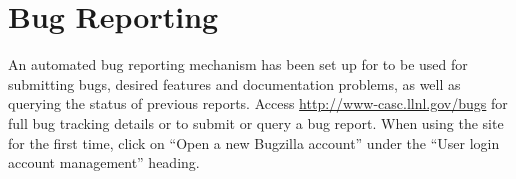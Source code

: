 %
%
%
%
%
%


\section{Bug Reporting}

An automated bug reporting mechanism has been set up for \hypre{} to be used for
submitting bugs, desired features and documentation problems, as well as
querying the status of previous reports.  Access
\url{http://www-casc.llnl.gov/bugs} for full bug tracking details or to submit
or query a bug report.  When using the site for the first time, click on ``Open
a new Bugzilla account'' under the ``User login account management'' heading.

